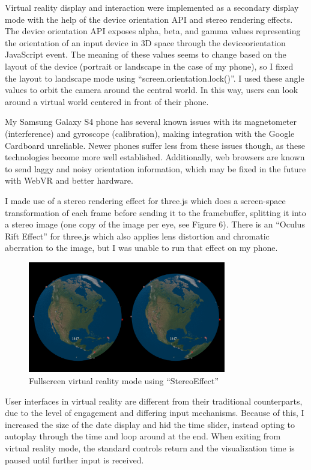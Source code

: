 \documentclass[conference]{acmsiggraph}
\begin{document}
Virtual reality display and interaction were implemented as a secondary display
mode with the help of the device orientation API and stereo rendering effects.
The device orientation API exposes alpha, beta, and gamma values representing
the orientation of an input device in 3D space through the deviceorientation
JavaScript event. The meaning of these values seems to change based on the
layout of the device (portrait or landscape in the case of my phone), so I fixed
the layout to landscape mode using ``screen.orientation.lock()''. I used these
angle values to orbit the camera around the central world. In this way, users
can look around a virtual world centered in front of their phone.

My Samsung Galaxy S4 phone has several known issues with its magnetometer
(interference) and gyroscope (calibration), making integration with the Google
Cardboard unreliable. Newer phones suffer less from these issues though, as
these technologies become more well established. Additionally, web browsers are
known to send laggy and noisy orientation information, which may be fixed in the
future with WebVR and better hardware.

I made use of a stereo rendering effect for three.js which does a screen-space
transformation of each frame before sending it to the framebuffer, splitting it
into a stereo image (one copy of the image per eye, see Figure 6). There is an
``Oculus Rift Effect'' for three.js which also applies lens distortion and
chromatic aberration to the image, but I was unable to run that effect on my
phone.

\begin{figure}
  \centering
  \includegraphics[width=3.4in]{images/vr}
  \caption{Fullscreen virtual reality mode using ``StereoEffect''}
\end{figure}

User interfaces in virtual reality are different from their traditional
counterparts, due to the level of engagement and differing input mechanisms.
Because of this, I increased the size of the date display and hid the time
slider, instead opting to autoplay through the time and loop around at the end.
When exiting from virtual reality mode, the standard controls return and the
visualization time is paused until further input is received.
\end{document}
